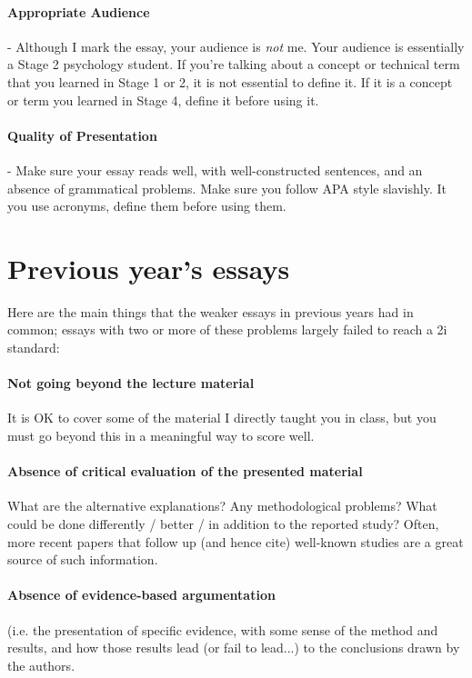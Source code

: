 \documentclass[11pt]{article}
\begin{document}
\paragraph{Appropriate Audience} - Although I mark the essay, your audience is \emph{not} me. Your audience is essentially a Stage 2 psychology student. If you're talking about a concept or technical term that you learned in Stage 1 or 2, it is not essential to define it. If it is a concept or term you learned in Stage 4, define it before using it.

\paragraph{Quality of Presentation} - Make sure your essay reads well, with well-constructed sentences, and an absence of grammatical problems. Make sure you follow APA style slavishly. It you use acronyms, define them before using them.

\section*{Previous year's essays}

Here are the main things that the weaker essays in previous years had in common; essays with two or more of these problems largely failed to reach a 2i standard: 

\paragraph{Not going beyond the lecture material} It is OK to cover some of the
material I directly taught you in class, but you must go beyond this in a
meaningful way to score well.

\paragraph{Absence of critical evaluation of the presented material}
What are the alternative explanations? Any methodological problems?
What could be done differently / better / in addition to the reported
study?  Often, more recent papers that follow up (and hence cite)
well-known studies are a great source of such information.

\paragraph{Absence of evidence-based argumentation} (i.e. the
presentation of specific evidence, with some sense of the method and
results, and how those results lead (or fail to lead...) to the
conclusions drawn by the authors.
\end{document}
